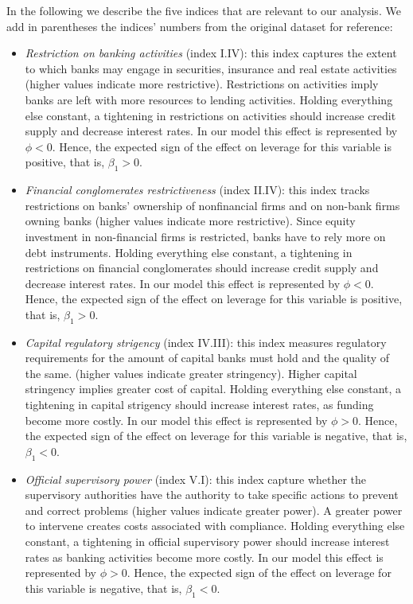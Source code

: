 \documentclass[12pt]{article}
\begin{document}
     In the following we describe the five indices that are relevant to our analysis. We add in parentheses the indices' numbers from the original dataset for reference:
      \begin{itemize}
     	\item \textit{Restriction on banking activities} (index I.IV): this index captures the extent to which banks may engage in securities, insurance and real estate activities (higher values indicate more restrictive). Restrictions on activities imply banks are left with more resources to lending activities. Holding everything else constant, a tightening in restrictions on activities should increase credit supply and decrease interest rates. In our model this effect is represented by $\phi<0$. Hence, the expected sign of the effect on leverage for this variable is positive, that is, $\beta_1>0$.
     	\item \textit{Financial conglomerates restrictiveness} (index II.IV): this index tracks restrictions on banks' ownership of nonfinancial firms and on non-bank firms owning banks (higher values indicate more restrictive). Since equity investment in non-financial firms is restricted, banks have to rely more on debt instruments. Holding everything else constant, a tightening in restrictions on financial conglomerates should increase credit supply and decrease interest rates. In our model this effect is represented by $\phi<0$. Hence, the expected sign of the effect on leverage for this variable is positive, that is, $\beta_1>0$.
     	\item  \textit{Capital regulatory strigency} (index IV.III): this index measures regulatory requirements for the amount of capital banks must hold and the quality of the same. (higher values indicate greater stringency). Higher capital stringency implies greater cost of capital. Holding everything else constant, a tightening in capital strigency should increase interest rates, as funding become more costly. In our model this effect is represented by $\phi>0$. Hence, the expected sign of the effect on leverage for this variable is negative, that is, $\beta_1<0$.
     	\item \textit{Official supervisory power} (index V.I): this index capture whether the supervisory authorities have the authority to take specific actions to prevent and correct problems (higher values indicate greater power). A greater power to intervene creates costs associated with compliance. Holding everything else constant, a tightening in official supervisory power should increase interest rates as banking activities become more costly. In our model this effect is represented by $\phi>0$. Hence, the expected sign of the effect on leverage for this variable is negative, that is, $\beta_1<0$.
     \end{itemize}
	
\end{document}
